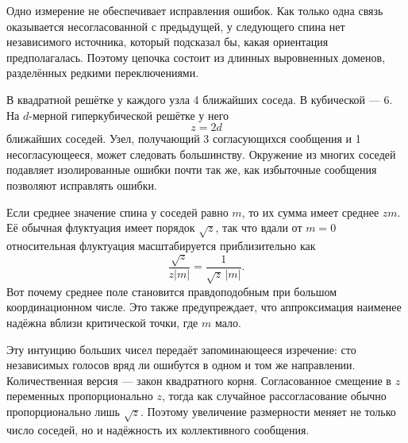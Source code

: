 Одно измерение не обеспечивает исправления ошибок. Как только одна связь оказывается несогласованной с предыдущей, у следующего спина нет независимого источника, который подсказал бы, какая ориентация предполагалась. Поэтому цепочка состоит из длинных выровненных доменов, разделённых редкими переключениями.

В квадратной решётке у каждого узла 4 ближайших соседа. В кубической — 6. На \(d\)-мерной гиперкубической решётке у него
\begin{equation}
z=2d
\end{equation}
ближайших соседей. Узел, получающий 3 согласующихся сообщения и 1 несогласующееся, может следовать большинству. Окружение из многих соседей подавляет изолированные ошибки почти так же, как избыточные сообщения позволяют исправлять ошибки.

Если среднее значение спина у соседей равно \(m\), то их сумма имеет среднее \(zm\). Её обычная флуктуация имеет порядок \(\sqrt{z}\), так что вдали от \(m=0\) относительная флуктуация масштабируется приблизительно как
\begin{equation}
\frac{\sqrt{z}}{z|m|}
=\frac{1}{\sqrt{z}\,|m|}.
\end{equation}
Вот почему среднее поле становится правдоподобным при большом координационном числе. Это также предупреждает, что аппроксимация наименее надёжна вблизи критической точки, где \(m\) мало.

Эту интуицию больших чисел передаёт запоминающееся изречение: сто независимых голосов вряд ли ошибутся в одном и том же направлении. Количественная версия — закон квадратного корня. Согласованное смещение в \(z\) переменных пропорционально \(z\), тогда как случайное рассогласование обычно пропорционально лишь \(\sqrt{z}\). Поэтому увеличение размерности меняет не только число соседей, но и надёжность их коллективного сообщения.

\begin{classroomqa}
\end{classroomqa}

